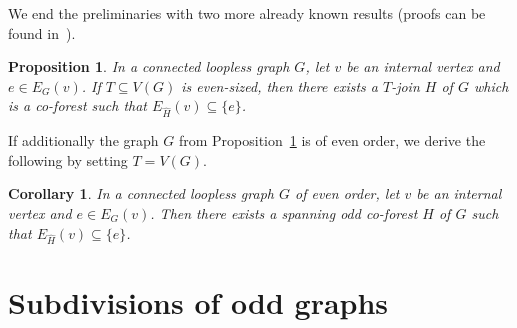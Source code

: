 \documentclass[a4paper,12pt]{article}
\newtheorem{corollary}[theorem]{Corollary}
\newtheorem{proposition}[theorem]{Proposition}
\numberwithin{equation}{section}
\begin{document}
 We end the preliminaries with two more already known results (proofs can be found in~\cite{Pet18}).

\begin{proposition}
    \label{co-forest}
In a connected loopless graph $G$, let $v$ be an internal vertex and $e\in E_G(v)$. If $T\subseteq V(G)$ is even-sized, then there exists a $T$-join $H$ of $G$ which is a co-forest such that $E_{\hat{H}}(v)\subseteq\{e\}$.
\end{proposition}

If additionally the graph $G$ from Proposition~\ref{co-forest} is of even order, we derive the following by setting $T=V(G)$.
\begin{corollary}
    \label{odd co-forest}
   In a connected loopless graph $G$ of even order, let $v$ be an internal vertex and $e\in E_G(v)$. Then there exists a spanning odd co-forest $H$ of $G$ such that $E_{\hat{H}}(v)\subseteq\{e\}$.

\end{corollary}


\section{Subdivisions of odd graphs}
\end{document}
